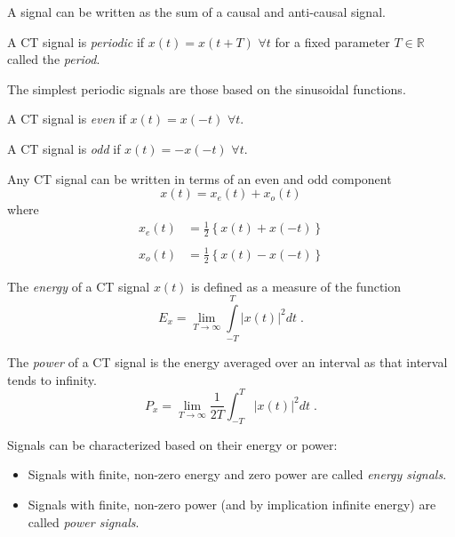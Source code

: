 A signal can be written as the sum of a causal and anti-causal signal.

\begin{definition}
  A CT signal is \emph{periodic} if $x(t) = x(t + T)$ $\forall t$ for a fixed parameter $T \in \mathbb{R}$ called the \emph{period}.
\end{definition}
  
The simplest periodic signals are those based on the sinusoidal functions.
  
\begin{definition}
  A CT signal is \emph{even} if $x(t) = x(-t)$ $\forall t$.
\end{definition}

\begin{definition}
  A CT signal is \emph{odd} if $x(t) = -x(-t)$ $\forall t$. 
\end{definition}

Any CT signal can be written in terms of an even and odd component
\[
x(t) = x_e(t) + x_o(t) 
\]
where 
\[
\begin{array}{ll}
  x_e(t) &= \frac{1}{2}\left\{x(t) + x(-t)\right\} \\
  & \\
  x_o(t) &= \frac{1}{2}\left\{x(t) - x(-t)\right\}
\end{array}
\]

\begin{definition}
  The \emph{energy} of a CT signal $x(t)$ is defined as a measure of the function
  \[
  E_x = \lim_{T\rightarrow\infty} \int\limits_{-T}^T \lvert x(t) \rvert^2 dt \; .
  \]
\end{definition}

\begin{definition}
  The \emph{power} of a CT signal is the energy averaged over an interval as that interval tends to infinity.
  \[
  P_x = \lim_{T\rightarrow\infty} \frac{1}{2T} \int_{-T}^T \lvert x(t)\rvert^2 dt \; .
  \]
\end{definition}

Signals can be characterized based on their energy or power:  
\begin{itemize}
\item Signals with finite, non-zero energy and zero power are called {\it energy signals}.
\item Signals with finite, non-zero power (and by implication infinite energy) are called {\it power signals}.
\end{itemize}

